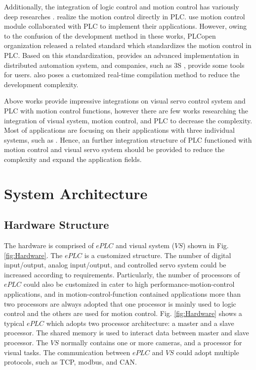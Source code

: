 \documentclass[journal,UTF8]{IEEEtran}
\begin{document}
Additionally, the integration of logic control and motion control has variously deep researches \cite{Ioannides2004Design,Shi2016The,Fang2017Design}. \cite{Ioannides2004Design,syaichu2011model} realize the motion control directly in PLC. \cite{Qian2014A, OMRON2006CS1W} use motion control module collaborated with PLC to implement their applications. However, owing to the confusion of the development method in these works, PLCopen organization released a related standard \cite{PLCopen2005Function} which standardizes the motion control in PLC. Based on this standardization, \cite{S2006Advanced} provides an advanced implementation in distributed automation system, and companies, such as 3S \cite{3S2017Logic}, provide some tools for users. \cite{wu2018customized} also poses a customized real-time compilation method to reduce the development complexity.

Above works provide impressive integrations on visual servo control system and PLC with motion control functions, however there are few works researching the integration of visual system, motion control, and PLC to decrease the complexity. Most of applications are focusing on their applications with three individual systems, such as \cite{Chen2014A}. Hence, an further integration structure of PLC functioned with motion control and visual servo system should be provided to reduce the complexity and expand the application fields.



\section{System Architecture}
\label{SystemStructure}
\subsection{Hardware Structure}
The hardware is comprised of $ePLC$ and visual system ($VS$) shown in Fig.\ref{fig:Hardware}. The $ePLC$ is a customized structure. The number of digital input/output, analog input/output, and controlled servo system could be increased according to requirements. Particularly, the number of processors of $ePLC$ could also be customized in cater to high performance-motion-control applications, and in motion-control-function contained applications more than two processors are always adopted that one processor is mainly used to logic control and the others are used for motion control. Fig. \ref{fig:Hardware} shows a typical $ePLC$ which adopts two processor architecture: a master and a slave processor. The shared memory is used to interact data between master and slave processor. The $VS$ normally contains one or more cameras, and a processor for visual tasks. The communication between $ePLC$ and $VS$ could adopt multiple protocols, such as TCP, modbus, and CAN.
\end{document}
